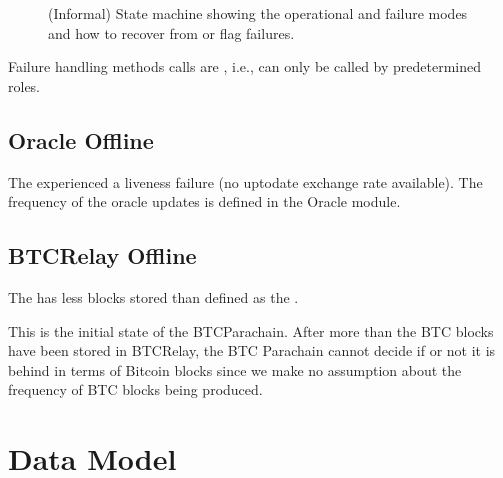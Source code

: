 \documentclass[a4paper,10pt,english]{sphinxmanual}
\begin{document}
\begin{figure}[htbp]
\centering
\capstart

\noindent{}
\caption{(Informal) State machine showing the operational and failure modes and how to recover from or flag failures.}\label{\detokenize{spec/security:id13}}\end{figure}

Failure handling methods calls are , i.e., can only be called by pre\sphinxhyphen{}determined roles.


\subsection{Oracle Offline}
\label{\detokenize{spec/security:oracle-offline}}\label{\detokenize{spec/security:oracle-offline-err}}
The {\hyperref[\detokenize{spec/oracle:oracle}]{}} experienced a liveness failure (no up\sphinxhyphen{}to\sphinxhyphen{}date exchange rate available).
The frequency of the oracle updates is defined in the Oracle module.

 


\subsection{BTC\sphinxhyphen{}Relay Offline}
\label{\detokenize{spec/security:btc-relay-offline}}
The {\hyperref[\detokenize{spec/btc-relay:btc-relay}]{}} has less blocks stored than defined as the .

This is the initial state of the BTC\sphinxhyphen{}Parachain. After more than the  BTC blocks have been stored in BTC\sphinxhyphen{}Relay, the BTC Parachain cannot decide if or not it is behind in terms of Bitcoin blocks since we make no assumption about the frequency of BTC blocks being produced.

 


\section{Data Model}
\label{\detokenize{spec/security:data-model}}
\end{document}
